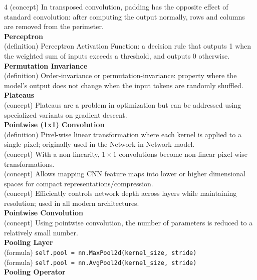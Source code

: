 \documentclass[8pt]{extarticle}
\begin{document}
\begin{multicols}{4}
(concept) In transposed convolution, padding has the opposite effect of standard convolution: after computing the output normally, rows and columns are removed from the perimeter.\\
\vspace{2pt}\textbf{Perceptron}\\
(definition) Perceptron Activation Function: a decision rule that outputs 1 when the weighted sum of inputs exceeds a threshold, and outputs 0 otherwise.\\
\vspace{2pt}\textbf{Permutation Invariance}\\
(definition) Order-invariance or permutation-invariance: property where the model's output does not change when the input tokens are randomly shuffled.\\
\vspace{2pt}\textbf{Plateaus}\\
(concept) Plateaus are a problem in optimization but can be addressed using specialized variants on gradient descent.\\
\vspace{2pt}\textbf{Pointwise (1x1) Convolution}\\
(definition) Pixel-wise linear transformation where each kernel is applied to a single pixel; originally used in the Network-in-Network model.\\
(concept) With a non-linearity, $1\times1$ convolutions become non-linear pixel-wise transformations.\\
(concept) Allows mapping CNN feature maps into lower or higher dimensional spaces for compact representations/compression.\\
(concept) Efficiently controls network depth across layers while maintaining resolution; used in all modern architectures.\\
\vspace{2pt}\textbf{Pointwise Convolution}\\
(concept) Using pointwise convolution, the number of parameters is reduced to a relatively small number.\\
\vspace{2pt}\textbf{Pooling Layer}\\
(formula) \texttt{self.pool = nn.MaxPool2d(kernel\_size, stride)}\\
(formula) \texttt{self.pool = nn.AvgPool2d(kernel\_size, stride)}\\
\vspace{2pt}\textbf{Pooling Operator}\\

\end{multicols}
\end{document}
